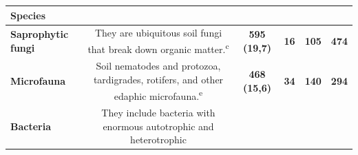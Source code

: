 \documentclass[11pt]{article}
\begin{document}
\begin{longtable}[]{@{}lccccc@{}}
\begin{minipage}[b]{0.04\columnwidth}
Species\strut
\end{minipage}\tabularnewline
\midrule
\endhead
\begin{minipage}[t]{0.11\columnwidth}\raggedright
\textbf{Saprophytic fungi}\strut
\end{minipage} & \begin{minipage}[t]{0.45\columnwidth}\centering
They are ubiquitous soil fungi that break down organic
matter.\textsuperscript{c}\strut
\end{minipage} & \begin{minipage}[t]{0.14\columnwidth}\centering
\textbf{595 (19,7)}\strut
\end{minipage} & \begin{minipage}[t]{0.04\columnwidth}\centering
\textbf{16}\strut
\end{minipage} & \begin{minipage}[t]{0.04\columnwidth}\centering
\textbf{105}\strut
\end{minipage} & \begin{minipage}[t]{0.04\columnwidth}\centering
\textbf{474}\strut
\end{minipage}\tabularnewline
\begin{minipage}[t]{0.11\columnwidth}\raggedright
\textbf{Microfauna}\strut
\end{minipage} & \begin{minipage}[t]{0.45\columnwidth}\centering
Soil nematodes and protozoa, tardigrades, rotifers, and other edaphic
microfauna.\textsuperscript{e}\strut
\end{minipage} & \begin{minipage}[t]{0.14\columnwidth}\centering
\textbf{468 (15,6)}\strut
\end{minipage} & \begin{minipage}[t]{0.04\columnwidth}\centering
\textbf{34}\strut
\end{minipage} & \begin{minipage}[t]{0.04\columnwidth}\centering
\textbf{140}\strut
\end{minipage} & \begin{minipage}[t]{0.04\columnwidth}\centering
\textbf{294}\strut
\end{minipage}\tabularnewline
\begin{minipage}[t]{0.11\columnwidth}\raggedright
\textbf{Bacteria}\strut
\end{minipage} & \begin{minipage}[t]{0.45\columnwidth}\centering
They include bacteria with enormous autotrophic and heterotrophic

\end{minipage}
\end{longtable}
\end{document}
